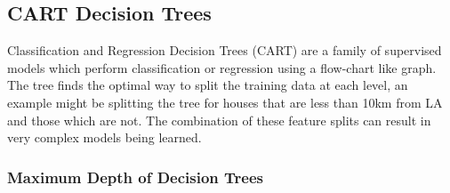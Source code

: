 \documentclass[11pt]{article}
\begin{document}

\subsection{CART Decision Trees}
\label{decision_trees}

Classification and Regression Decision Trees (CART) are a family of supervised models which perform classification or regression using a flow-chart like graph. The tree finds the optimal way to split the training data at each level, an example might be splitting the tree for houses that are less than 10km from LA and those which are not. The combination of these feature splits can result in very complex models being learned.

\subsubsection{Maximum Depth of Decision Trees}
\label{reg_tree_depths}



\end{document}
